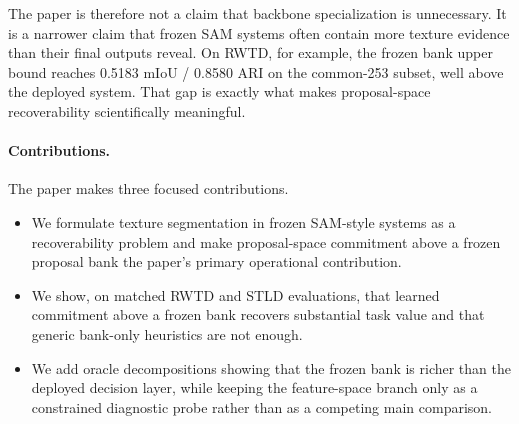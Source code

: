 The paper is therefore not a claim that backbone specialization is unnecessary. It is a narrower claim that frozen SAM systems often contain more texture evidence than their final outputs reveal. On RWTD, for example, the frozen bank upper bound reaches 0.5183 mIoU / 0.8580 ARI on the common-253 subset, well above the deployed system. That gap is exactly what makes proposal-space recoverability scientifically meaningful.

\paragraph{Contributions.} The paper makes three focused contributions.
\begin{itemize}[leftmargin=1.2em]
\item We formulate texture segmentation in frozen SAM-style systems as a recoverability problem and make proposal-space commitment above a frozen proposal bank the paper's primary operational contribution.
\item We show, on matched RWTD and STLD evaluations, that learned commitment above a frozen bank recovers substantial task value and that generic bank-only heuristics are not enough.
\item We add oracle decompositions showing that the frozen bank is richer than the deployed decision layer, while keeping the feature-space branch only as a constrained diagnostic probe rather than as a competing main comparison.
\end{itemize}
